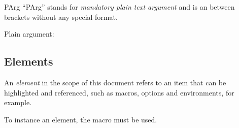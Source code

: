 \documentclass[11pt, outputdir = ./out]{article}
\begin{document}
\begin{Macrodef}{PArg}{}{}
    ``PArg'' stands for \textit{mandatory plain text argument} and is an  between brackets without any special format.
\end{Macrodef}

\begin{example}{}
    Plain argument: 
\end{example}


\subsection{Elements}

An \textit{element} in the scope of this document refers to an item that can be highlighted and referenced, such as macros, options and environments, for example.

To instance an element, the  macro must be used.
\end{document}
